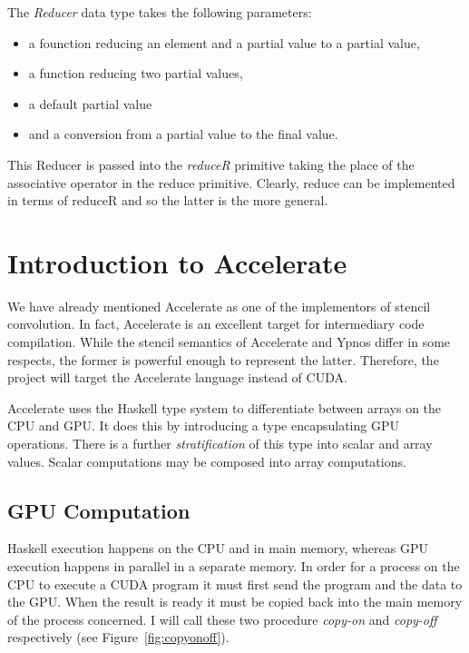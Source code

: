 \documentclass[12pt,a4paper,oneside]{scrbook}
\begin{document}
The \emph{Reducer} data type takes the following parameters:

\begin{itemize}
\itemsep1pt\parskip0pt
\item
  a founction reducing an element and a partial value to a partial value,
\item
  a function reducing two partial values,
\item
  a default partial value
\item
  and a conversion from a partial value to the final value.
\end{itemize}

This Reducer is passed into the \emph{reduceR} primitive taking the place of the
associative operator in the reduce primitive. Clearly, reduce can be implemented
in terms of reduceR and so the latter is the more general.

\section{Introduction to Accelerate}

We have already mentioned Accelerate as one of the implementors of stencil
convolution. In fact, Accelerate is an excellent target for intermediary code
compilation. While the stencil semantics of Accelerate and Ypnos differ in some
respects, the former is powerful enough to represent the latter. Therefore, the
project will target the Accelerate language instead of CUDA.

Accelerate uses the Haskell type system to differentiate between arrays
on the CPU and GPU. It does this by introducing a type encapsulating GPU
operations. There is a further \emph{stratification} of this type into
scalar and array values. Scalar computations may be composed into
array computations.

\subsection{GPU Computation}

Haskell execution happens on the CPU and in main memory, whereas GPU execution
happens in parallel in a separate memory. In order for a process on the CPU to
execute a CUDA program it must first send the program and the data to the
GPU. When the result is ready it must be copied back into the main memory of the
process concerned. I will call these two procedure \emph{copy-on} and
\emph{copy-off} respectively (see Figure~\ref{fig:copyonoff}).
\end{document}
